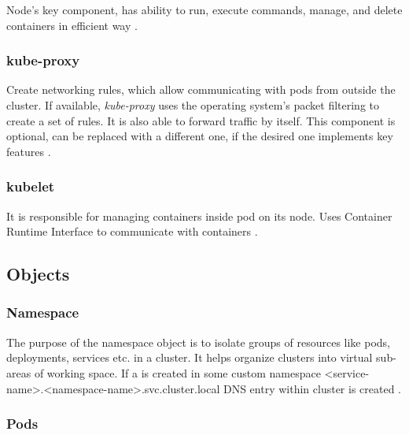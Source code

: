 Node's key component, has ability to run, execute commands, manage, and delete containers in efficient way \cite{KubernetesDocs}. 



\subsubsection{kube-proxy}
\label{sec:kubeProxy}

Create networking rules, which allow communicating with pods from outside the cluster. If available, \textit{kube-proxy} uses the operating system's packet filtering to create a set of rules. It is also able to forward traffic by itself. This component is optional, can be replaced with a different one, if the desired one implements key features \cite{KubernetesDocs}.


\subsubsection{kubelet}
\label{sec:kubelet}

It is responsible for managing containers inside pod on its node. Uses Container Runtime Interface to communicate with containers \cite{KubernetesDocs}.


\subsection{Objects}    
\label{sec:k8s_objects}

\subsubsection{Namespace}
\label{sec:namespace}

The purpose of the namespace object is to isolate groups of resources like pods, deployments, services etc. in a cluster. It helps organize clusters into virtual sub-areas of working space. If a \textit{} is created in some custom namespace <service-name>.<namespace-name>.svc.cluster.local DNS entry within cluster is created \cite{KubernetesDocs}.

\subsubsection{Pods}
\label{sec:pods}


